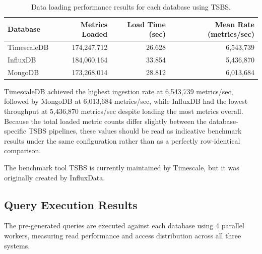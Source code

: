 \begin{table}[ht!]
    \centering
    \begin{tabular}{|l|r|r|r|} %
        \hline %
        \textbf{Database} & \textbf{Metrics Loaded} & \textbf{Load Time (sec)} & \textbf{Mean Rate (metrics/sec)} \\
        \hline %
        TimescaleDB       & 174,247,712             & 26.628                   & 6,543,739                        \\
        InfluxDB          & 184,060,164             & 33.854                   & 5,436,870                        \\
        MongoDB           & 173,268,014             & 28.812                   & 6,013,684                        \\
        \hline %
    \end{tabular}
    \caption{Data loading performance results for each database using TSBS.}\label{tab:tsbs-data-loading-results}
\end{table}

TimescaleDB achieved the highest ingestion rate at 6,543,739 metrics/sec,
followed by MongoDB at 6,013,684 metrics/sec, while InfluxDB had the lowest
throughput at 5,436,870 metrics/sec despite loading the most metrics overall.
Because the total loaded metric counts differ slightly between the database-
specific TSBS pipelines, these values should be read as indicative benchmark
results under the same configuration rather than as a perfectly row-identical
comparison.

\begin{tcolorbox}[
        colback=red!5!white, %
        colframe=red!75!black, %
        title=\textbf{Disclaimer}, %
        fonttitle=\bfseries\sffamily, %
        boxsep=5pt, %
        arc=4pt, %
        boxrule=0.5pt %
    ]
    The benchmark tool TSBS is currently maintained by Timescale, but it was originally created by InfluxData\@.
\end{tcolorbox}

\subsection{Query Execution Results}

The pre-generated queries are executed against each database using 4 parallel
workers, measuring read performance and access distribution across all three
systems.

